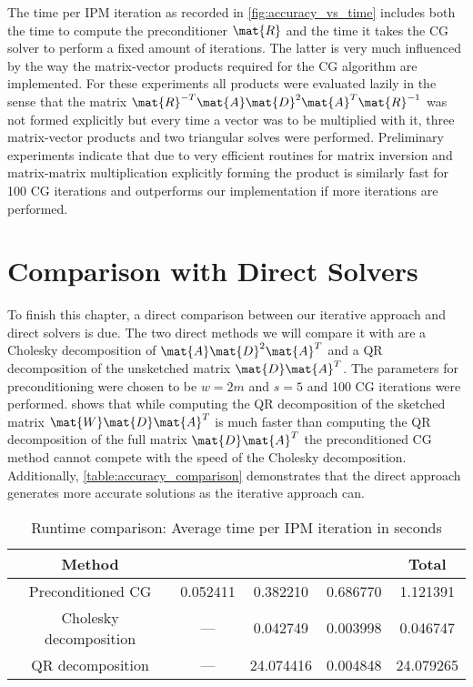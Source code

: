 The time per IPM iteration as recorded in \cref{fig:accuracy_vs_time} includes both the time to compute the preconditioner \(\mat{R}\) and the time it takes the CG solver to perform a fixed amount of iterations.
The latter is very much influenced by the way the matrix-vector products required for the CG algorithm are implemented.
For these experiments all products were evaluated lazily in the sense that the matrix \(\mat{R}^{-T}\mat{A}\mat{D}^2\mat{A}^T\mat{R}^{-1}\) was not formed explicitly but every time a vector was to be multiplied with it, three matrix-vector products and two triangular solves were performed.
Preliminary experiments indicate that due to very efficient routines for matrix inversion and matrix-matrix multiplication explicitly forming the product is similarly fast for 100 CG iterations and outperforms our implementation if more iterations are performed.

\section{Comparison with Direct Solvers}

To finish this chapter, a direct comparison between our iterative approach and direct solvers is due.
The two direct methods we will compare it with are a Cholesky decomposition of \(\mat{A}\mat{D}^2\mat{A}^T\) and a QR decomposition of the unsketched matrix \(\mat{D}\mat{A}^T\).
The parameters for preconditioning were chosen to be \(w=2m\) and \(s=5\) and 100 CG iterations were performed.
 shows that while computing the QR decomposition of the sketched matrix \(\mat{W}\mat{D}\mat{A}^T\) is much faster than computing the QR decomposition of the full matrix \(\mat{D}\mat{A}^T\) the preconditioned CG method cannot compete with the speed of the Cholesky decomposition.
Additionally, \cref{table:accuracy_comparison} demonstrates that the direct approach generates more accurate solutions as the iterative approach can.

\begin{table}[htbp]
  \centering
  \begin{tabular}{cSSSS}
    \toprule
    Method & {} & {} & {} & {Total} \\
    \midrule
    Preconditioned CG      & 0.052411 &  0.382210 & 0.686770 &  1.121391 \\
    Cholesky decomposition & {---}      &  0.042749 & 0.003998 &  0.046747 \\
    QR decomposition       & {---}      & 24.074416 & 0.004848 & 24.079265 \\
    \bottomrule
  \end{tabular}
  \caption{Runtime comparison: Average time per IPM iteration in seconds}
  \label{table:runtime_comparison}
\end{table}

